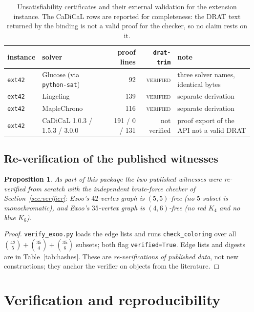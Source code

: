 \documentclass[11pt]{article}
\newtheorem{proposition}[theorem]{Proposition}
\theoremstyle{definition}
\theoremstyle{plain}
\newcommand{\K}{\ensuremath{K}}
\begin{document}
\begin{table}[ht]\centering\small
\begin{tabular}{llrrl}
\toprule
instance & solver & proof lines & \texttt{drat-trim} & note \\
\midrule
\texttt{ext42} & Glucose (via \texttt{python-sat}) & 92 & \textsc{verified} & three solver names, identical bytes \\
\texttt{ext42} & Lingeling & 139 & \textsc{verified} & separate derivation \\
\texttt{ext42} & MapleChrono & 116 & \textsc{verified} & separate derivation \\
\texttt{ext42} & CaDiCaL 1.0.3 / 1.5.3 / 3.0.0 & 191 / 0 / 131 & not verified & proof export of the API not a valid DRAT \\
\bottomrule
\end{tabular}
\caption{Unsatisfiability certificates and their external validation for the
extension instance. The CaDiCaL rows are reported for completeness: the DRAT
text returned by the binding is not a valid proof for the checker, so no claim
rests on it.}
\label{tab:proofs}
\end{table}

\subsection{Re-verification of the published witnesses}\label{sec:reswitnesses}

\begin{proposition}\label{prop:witnesses}
As part of this package the two published witnesses were re-verified from
scratch with the independent brute-force checker of
Section~\ref{sec:verifier}: Exoo's $42$-vertex graph is $(5,5)$-free
(no $5$-subset is monochromatic), and Exoo's $35$-vertex graph is $(4,6)$-free
(no red $\K_4$ and no blue $\K_6$).
\end{proposition}

\begin{proof}
\texttt{verify\_exoo.py} loads the edge lists and runs
\texttt{check\_coloring} over all $\binom{42}{5}+\binom{35}{4}+\binom{35}{6}$
subsets; both flag \texttt{verified=True}. Edge lists and digests are in
Table~\ref{tab:hashes}. These are \emph{re-verifications of published data},
not new constructions; they anchor the verifier on objects from the literature.
\end{proof}

\section{Verification and reproducibility}\label{sec:repro}
\end{document}
